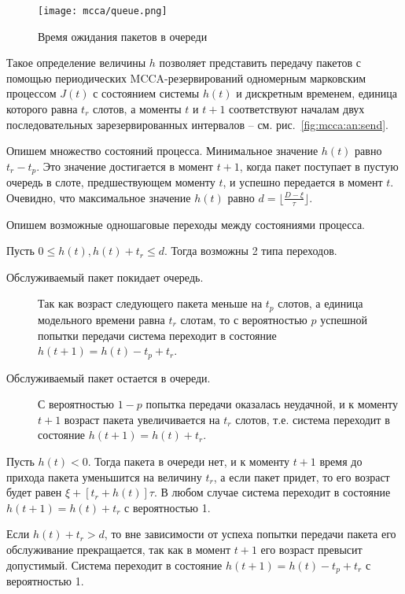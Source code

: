 \begin{figure}
 \centering
      \texttt{[image: mcca/queue.png]} \\
     \caption{\label{fig:mcca:an:queue}  Время ожидания пакетов в очереди}
 \end{figure}

Такое определение величины $h$ позволяет представить передачу пакетов с помощью периодических MCCA-резервирований одномерным марковским процессом $J(t)$ с состоянием системы $h(t)$ и дискретным временем, единица которого равна $t_r$ слотов, а моменты  $t$ и $t+1$  соответствуют началам двух последовательных зарезервированных интервалов -- см. рис.~\ref{fig:mcca:an:send}.

Опишем множество состояний процесса. Минимальное значение $h(t)$ равно $t_r - t_p$. Это значение достигается в момент $t+1$, когда пакет поступает в пустую очередь в слоте, предшествующем моменту $t$, и успешно передается в момент $t$. Очевидно, что максимальное значение $h(t)$ равно $d=\lfloor \frac{D-\xi}{\tau}\rfloor$.

Опишем возможные одношаговые переходы между состояниями процесса.

Пусть $0 \leq h(t), h(t)+t_r\leq d$. Тогда возможны 2 типа переходов.

 \begin{description}
   \item[Обслуживаемый пакет покидает очередь.] Так как возраст следующего пакета меньше на $t_p$ слотов, а единица модельного времени равна $t_r$ слотам, то с вероятностью $p$ успешной попытки передачи система переходит в состояние  $h(t+1) = h(t) - t_p + t_r$.
   \item[Обслуживаемый пакет остается в очереди.] С вероятностью $1-p$ попытка передачи оказалась неудачной, и к моменту $t+1$ возраст пакета увеличивается на $t_r$ слотов, т.е. система переходит в состояние $h(t+1)=h(t)+t_r$.
 \end{description}

Пусть $h(t) < 0$. Тогда пакета в очереди нет, и к моменту $t+1$ время до прихода пакета уменьшится на величину $t_r$, а если пакет придет, то его возраст будет равен $\xi + [t_r+h(t)]\tau$. В любом случае система переходит в состояние  $h(t+1)=h(t)+t_r$ с вероятностью 1.

Если $h(t)+t_r > d$, то вне зависимости от успеха попытки передачи пакета его обслуживание прекращается, так как в момент $t+1$ его возраст превысит допустимый. Система переходит в состояние $h(t+1) = h(t) - t_p + t_r$ с вероятностью 1.

